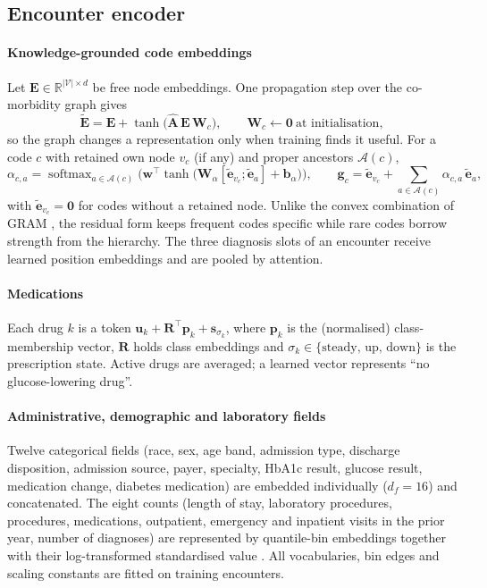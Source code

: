 \documentclass[preprint,12pt,authoryear]{elsarticle}
\newcommand{\R}{\mathbb{R}}
\newcommand{\vect}[1]{\mathbf{#1}}
\begin{document}
\subsection{Encounter encoder}
\label{sec:encoder}
\paragraph{Knowledge-grounded code embeddings}
Let $\vect{E}\in\R^{|\mathcal{V}|\times d}$ be free node embeddings. One
propagation step over the co-morbidity graph gives
\begin{equation}
  \tilde{\vect{E}} = \vect{E} + \tanh\!\big(\hat{\vect{A}}\,\vect{E}\,\vect{W}_c\big),
  \qquad \vect{W}_c \leftarrow \vect{0}\ \text{at initialisation},
\end{equation}
so the graph changes a representation only when training finds it
useful. For a code $c$ with retained own node $v_c$ (if any) and proper
ancestors $\mathcal{A}(c)$,
\begin{equation}
  \alpha_{c,a} = \operatorname{softmax}_{a\in\mathcal{A}(c)}
    \Big(\vect{w}^\top \tanh\big(\vect{W}_\alpha[\tilde{\vect{e}}_{v_c};\tilde{\vect{e}}_a] + \vect{b}_\alpha\big)\Big),
  \qquad
  \vect{g}_c = \tilde{\vect{e}}_{v_c} + \sum_{a\in\mathcal{A}(c)} \alpha_{c,a}\,\tilde{\vect{e}}_a ,
\end{equation}
with $\tilde{\vect{e}}_{v_c}=\vect{0}$ for codes without a retained node.
Unlike the convex combination of GRAM \citep{choi2017gram}, the residual
form keeps frequent codes specific while rare codes borrow strength from
the hierarchy. The three diagnosis slots of an encounter receive learned
position embeddings and are pooled by attention.

\paragraph{Medications} Each drug $k$ is a token
$\vect{u}_k + \vect{R}^\top\vect{p}_k + \vect{s}_{\sigma_k}$, where
$\vect{p}_k$ is the (normalised) class-membership vector, $\vect{R}$ holds
class embeddings and $\sigma_k\in\{\text{steady, up, down}\}$ is the
prescription state. Active drugs are averaged; a learned vector represents
``no glucose-lowering drug''.

\paragraph{Administrative, demographic and laboratory fields}
Twelve categorical fields (race, sex, age band, admission type, discharge
disposition, admission source, payer, specialty, HbA1c result, glucose
result, medication change, diabetes medication) are embedded
individually ($d_f=16$) and concatenated. The eight counts (length of
stay, laboratory procedures, procedures, medications, outpatient,
emergency and inpatient visits in the prior year, number of diagnoses)
are represented by quantile-bin embeddings together with their
log-transformed standardised value \citep{gorishniy2022}. All vocabularies,
bin edges and scaling constants are fitted on training encounters.
\end{document}

